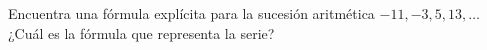 Encuentra una fórmula explícita para la sucesión aritmética  $-11,-3,5,13, \dots$
¿Cu\'al es la f\'ormula que representa la serie? \fillin[$-11+8(n-1)$]
